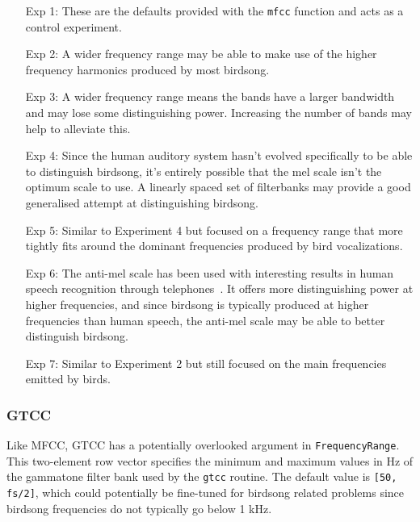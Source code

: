 \begin{itemize}

  \item [Exp 1:] These are the defaults provided with the \texttt{mfcc}
    function and acts as a control experiment.

  \item [Exp 2:] A wider frequency range may be able to make use of the
    higher frequency harmonics produced by most birdsong.

  \item [Exp 3:] A wider frequency range means the bands have a larger bandwidth
    and may lose some distinguishing power. Increasing the number of bands may
    help to alleviate this.

  \item [Exp 4:] Since the human auditory system hasn't evolved specifically to be
    able to distinguish birdsong, it's entirely possible that the mel scale
    isn't the optimum scale to use. A linearly spaced set of filterbanks may
    provide a good generalised attempt at distinguishing birdsong.

  \item [Exp 5:] Similar to Experiment 4 but focused on a frequency range that
    more tightly fits around the dominant frequencies produced by bird
    vocalizations.

  \item [Exp 6:] The anti-mel scale has been used with interesting results in
    human speech recognition through telephones~\cite{lei2009mel}. It offers
    more distinguishing power at higher frequencies, and since birdsong is
    typically produced at higher frequencies than human speech, the anti-mel
    scale may be able to better distinguish birdsong.

  \item [Exp 7:] Similar to Experiment 2 but still focused on the main
    frequencies emitted by birds.

\end{itemize}

\subsubsection{GTCC}\label{sssec:gtcc}

Like MFCC, GTCC has a potentially overlooked argument in
\texttt{FrequencyRange}. This two-element row vector specifies the minimum and
maximum values in Hz of the gammatone filter bank used by the \texttt{gtcc}
routine. The default value is \texttt{[50, fs/2]}, which could potentially be
fine-tuned for birdsong related problems since birdsong frequencies do not
typically go below 1 kHz.

